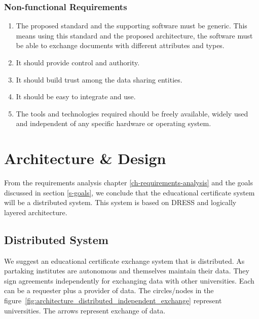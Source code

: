 \documentclass[12pt,a4paper,oneside]{book}
\begin{document}
    \subsection{Non-functional Requirements}

	\begin{enumerate}

		\item The proposed standard and the supporting software must be generic. This means using this standard and the proposed architecture, the software must be able to exchange documents with different attributes and types. 

		\item It should provide control and authority.
	
		\item It should build trust among the data sharing entities. 	
		
		\item It should be easy to integrate and use.
		
		\item The tools and technologies required should be freely available, widely used and independent of any specific hardware or operating system.

	\end{enumerate}

\chapter{Architecture \& Design}\label{ch-architecture-design}
From the requirements analysis chapter \ref{ch-requirements-analysis} and the goals discussed in section \ref{s-goals}, we conclude that the educational certificate system will be a distributed system. This system is based on DRESS and logically layered architecture.



	


\section{Distributed System}
We suggest an educational certificate exchange system that is distributed. As partaking institutes are autonomous and themselves maintain their data. They sign agreements independently for exchanging data with other universities. Each can be a requester plus a provider of data. The circles/nodes in the figure~\ref{fig:architecture_distributed_independent_exchange} represent universities. The arrows represent exchange of data. \\
\end{document}
